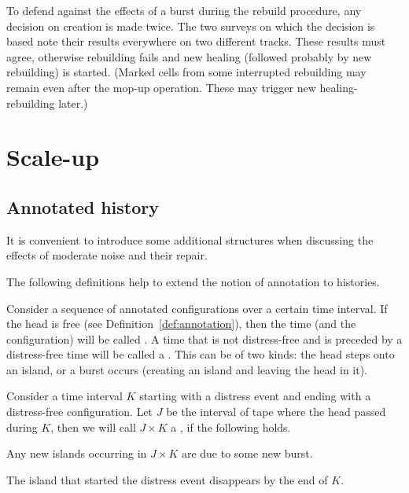\documentclass[11pt]{memoir}
\theoremstyle{definition} %
\newcommand{\Z}{Z}
\begin{document}
To defend against the effects of a burst during the rebuild procedure,
any decision on creation is made twice.
The two surveys on which the decision is based note their results everywhere on two different tracks.
These results must agree, otherwise rebuilding fails and new healing (followed probably by new rebuilding)
is started.
(Marked cells from some interrupted rebuilding may remain even after the mop-up operation.
These may trigger new healing-rebuilding later.)


\section{Scale-up}

\subsection{Annotated history}

It is convenient to introduce some additional structures when discussing
the effects of moderate noise and their repair.

The following definitions help to extend the notion of annotation to histories.

\begin{definition}\label{def:distress}
Consider a sequence of annotated configurations over a certain time interval.
If the head is free (see Definition~\ref{def:annotation}), then
the time (and the configuration) will be called .
A time that is not distress-free and is preceded by
a distress-free time will be called a .
This can be of two kinds: the head steps onto an island, or a burst occurs
(creating an island and leaving the head in it).


Consider a time interval \( K \) starting with a distress event and
ending with a distress-free configuration.
Let \( J \) be the interval of tape where the head passed during \( K \), then 
we will call \( J\times K \) a , if the following holds.

\begin{alphenumIn}
\item Any new islands occurring in \( J \times K \) are due to some new burst.
\item The island that started the distress event disappears by the end of \( K \).
\end{alphenumIn}
\end{definition}
\end{document}
